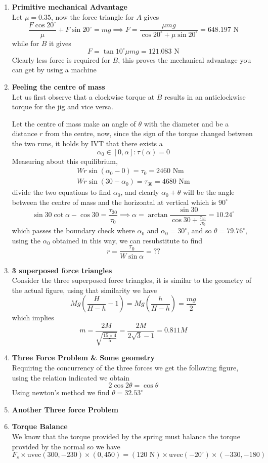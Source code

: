 \documentclass[12pt]{article}
\begin{document}
\begin{enumerate}
\item \textbf{Primitive mechanical Advantage} \\
Let $\mu = 0.35$, now the force triangle for $A$ gives
$$
\frac{F\cos 20^{\circ}}{\mu} + F \sin 20^{\circ} = mg \implies F = \frac{\mu mg}{\cos 20^{\circ} + \mu \sin 20 ^{\circ}} = 648.197 \text{ N}
$$
while for $B$ it gives
$$
F = \tan 10^{\circ} \mu m g = 121.083 \text{ N}
$$
Clearly less force is required for $B$, this proves the mechanical advantage you can get by using a machine
\item \textbf{Feeling the centre of mass} \\
Let us first observe that a clockwise torque at $B$ results in an anticlockwise torque for the jig and vice versa.

Let the centre of mass make an angle of $\theta$ with the diameter and be a distance $r$ from the centre, now, since the sign of the torque changed between the two runs, it holds by IVT that there exists a 
$$
\alpha_{0} \in [0,\alpha]: \tau(\alpha) = 0
$$
Measuring about this equilibrium, 
$$
\begin{aligned}
Wr \sin (\alpha_{0} -0) = \tau_{0} = 2460 \text{ Nm} \\
Wr \sin (30 -\alpha_{0}) = \tau_{30} = 4680 \text{ Nm}
\end{aligned}
$$
divide the two equations to find $\alpha_{0}$, and clearly $\alpha_{0} + \theta$ will be the angle between the centre of mass and the horizontal at vertical which is $90^{\circ}$
$$
\sin 30 \cot \alpha - \cos 30 = \frac{\tau_{30}}{\tau_{0}} \implies \alpha = \arctan \frac{\sin 30}{\cos 30 + \frac{\tau_{30}}{.\tau_{0}}} = 10.24^{\circ}
$$
which passes the boundary check where $\alpha_{0}$ and $\alpha_{0} = 30^{\circ}$, and so $\theta = 79.76^{\circ}$, using the $\alpha_{0}$ obtained in this way, we can resubstitute to find
$$
r = \frac{\tau_{0}}{W \sin \alpha} = ??
$$
\item \textbf{3 superposed force triangles} \\
Consider the three superposed force triangles, it is similar to the geometry of the actual figure, using that similarity we have
$$
Mg\left(  \frac{H}{H-h}-1 \right) = Mg\left( \frac{h}{H-h} \right) = \frac{mg}{2}
$$
which implies
$$
m  = \frac{2M}{\sqrt{ \frac{15\times4}{5} }} = \frac{2M}{2\sqrt{ 3 }-1} = 0.811 M
$$
\item \textbf{Three Force Problem \& Some geometry} \\
Requiring the concurrency of the three forces we get the following figure, using the relation indicated we obtain
$$
2\cos 2\theta = \cos \theta
$$
Using newton's method we find $\theta = 32.53^{\circ}$
\item \textbf{Another Three force Problem} \\
\item \textbf{Torque Balance} \\
We know that the torque provided by the spring must balance the torque provided by the normal so we have
$$
F_{s} \times\text{uvec}(300,-230)\times(0,450) = (120 \text{ N})\times \text{uvec}(-20^{\circ}) \times(-330,-180)
$$


\end{enumerate}
\end{document}
